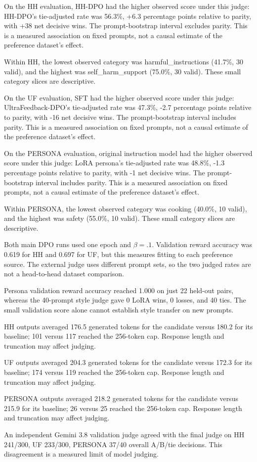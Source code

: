 On the HH evaluation, HH-DPO had the higher observed score under this judge: HH-DPO's tie-adjusted rate was 56.3\%, +6.3 percentage points relative to parity, with +38 net decisive wins. The prompt-bootstrap interval excludes parity. This is a measured association on fixed prompts, not a causal estimate of the preference dataset's effect.

Within HH, the lowest observed category was harmful\_instructions (41.7\%, 30 valid), and the highest was self\_harm\_support (75.0\%, 30 valid). These small category slices are descriptive.

On the UF evaluation, SFT had the higher observed score under this judge: UltraFeedback-DPO's tie-adjusted rate was 47.3\%, -2.7 percentage points relative to parity, with -16 net decisive wins. The prompt-bootstrap interval includes parity. This is a measured association on fixed prompts, not a causal estimate of the preference dataset's effect.

On the PERSONA evaluation, original instruction model had the higher observed score under this judge: LoRA persona's tie-adjusted rate was 48.8\%, -1.3 percentage points relative to parity, with -1 net decisive wins. The prompt-bootstrap interval includes parity. This is a measured association on fixed prompts, not a causal estimate of the preference dataset's effect.

Within PERSONA, the lowest observed category was cooking (40.0\%, 10 valid), and the highest was safety (55.0\%, 10 valid). These small category slices are descriptive.

Both main DPO runs used one epoch and $\beta=.1$. Validation reward accuracy was 0.619 for HH and 0.697 for UF, but this measures fitting to each preference source. The external judge uses different prompt sets, so the two judged rates are not a head-to-head dataset comparison.

Persona validation reward accuracy reached 1.000 on just 22 held-out pairs, whereas the 40-prompt style judge gave 0 LoRA wins, 0 losses, and 40 ties. The small validation score alone cannot establish style transfer on new prompts.

HH outputs averaged 176.5 generated tokens for the candidate versus 180.2 for its baseline; 101 versus 117 reached the 256-token cap. Response length and truncation may affect judging.

UF outputs averaged 204.3 generated tokens for the candidate versus 172.3 for its baseline; 174 versus 119 reached the 256-token cap. Response length and truncation may affect judging.

PERSONA outputs averaged 218.2 generated tokens for the candidate versus 215.9 for its baseline; 26 versus 25 reached the 256-token cap. Response length and truncation may affect judging.

An independent Gemini 3.8 validation judge agreed with the final judge on HH 241/300, UF 233/300, PERSONA 37/40 overall A/B/tie decisions. This disagreement is a measured limit of model judging.
